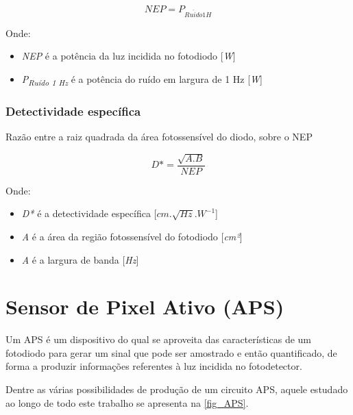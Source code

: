 \begin{equation}
    NEP = P_{Ru\acute{i}do 1 H}
\end{equation}

Onde:
\begin{itemize}
    \item \textit{NEP} \'e a pot\^encia da luz incidida no fotodiodo [\textit{W}]
    \item \textit{P\textsubscript{Ruído 1 Hz}} \'e a potência do ruído em largura de 1 Hz [\textit{W}]
\end{itemize}

\subsubsection{Detectividade espec\'ifica}
Razão entre a raiz quadrada da área fotossensível do diodo, sobre o NEP

\begin{equation}
    D* = \frac{\sqrt{A.B}}{NEP}
\end{equation}

Onde:

\begin{itemize}
    \item \textit{D*} \'e a detectividade espec\'ifica [$cm.\sqrt{Hz}.W^{-1}$]
    \item \textit{A} \'e a \'area da região fotossens\'ivel do fotodiodo [\textit{cm²}]
    \item \textit{A} \'e a largura de banda [\textit{Hz}]
\end{itemize}

\section{Sensor de Pixel Ativo (APS)}
\label{section:APS}
Um APS \'e um dispositivo do qual se aproveita das características de um fotodiodo para gerar um sinal que pode ser amostrado e então quantificado, de forma a produzir informações referentes à luz incidida no fotodetector.

Dentre as várias possibilidades de produção de um circuito APS, aquele estudado ao longo de todo este trabalho se apresenta na \autoref{fig_APS}.

